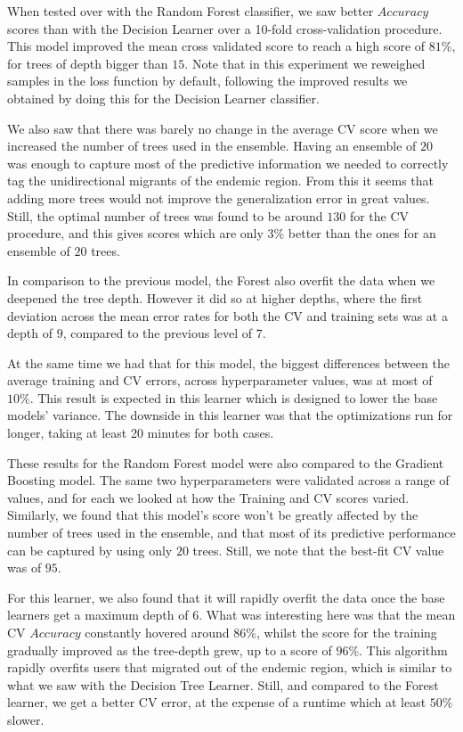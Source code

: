 When tested over with the Random Forest classifier, we saw better $Accuracy$ scores than with the Decision Learner over a 10-fold cross-validation procedure.
This model improved the mean cross validated score to reach a high score of $81\%$, for trees of depth bigger than $15$.
Note that in this experiment we reweighed samples in the loss function by default, following the improved results we obtained by doing this for the Decision Learner classifier.

We also saw that there was barely no change in the average CV score when we increased the number of trees used in the ensemble.
Having an ensemble of $20$ was enough to capture most of the predictive information we needed to correctly tag the unidirectional migrants of the endemic region.
From this it seems that adding more trees would not improve the generalization error in great values.
Still, the optimal number of trees was found to be around $130$ for the CV procedure, and this gives scores which are only $3\%$ better than the ones for an ensemble of $20$ trees.

In comparison to the previous model, the Forest also overfit the data when we deepened the tree depth.
However it did so at higher depths, where the first deviation across the mean error rates for both the CV and training sets was at a depth of $9$, compared to the previous level of $7$.

At the same time we had that for this model, the biggest differences between the average training and CV errors, across hyperparameter values, was at most of $10\%$.
This result is expected in this learner which is designed to lower the base models' variance.
The downside in this learner was that the optimizations run for longer, taking at least 20 minutes for both cases.

These results for the Random Forest model were also compared to the Gradient Boosting model.
The same two hyperparameters were validated across a range of values, and for each we looked at how the Training and CV scores varied.
Similarly, we found that this model's score won't be greatly affected by the number of trees used in the ensemble, and that most of its predictive performance can be captured by using only $20$ trees.
Still, we note that the best-fit CV value was of $95$.

For this learner, we also found that it will rapidly overfit the data once the base learners get a maximum depth of $6$.
What was interesting here was that the mean CV $Accuracy$ constantly hovered around $86\%$, whilst the score for the training gradually improved as the tree-depth grew, up to a score of $96\%$.
This algorithm rapidly overfits users that migrated out of the endemic region, which is similar to what we saw with the Decision Tree Learner.
Still, and compared to the Forest learner, we get a better CV error, at the expense of a runtime which at least $50\%$ slower.

